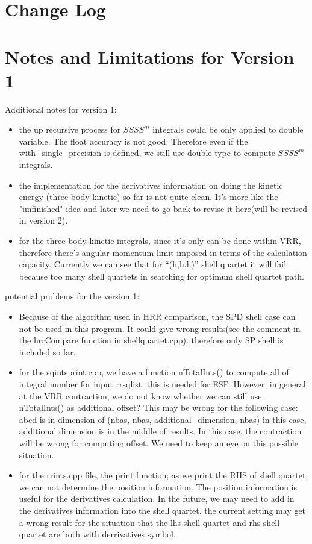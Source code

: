 \section{Change Log}

\section{Notes and Limitations for Version 1}
\label{v1_notes_limits}

Additional notes for version 1:
\begin{itemize}
 \item the up recursive process for $SSSS^{m}$ integrals could be
  only applied to double variable. The float accuracy
  is not good. Therefore even if the with\_single\_precision
  is defined, we still use double type to compute $SSSS^{m}$
  integrals.
 \item the implementation for the derivatives information on
  doing the kinetic energy (three body kinetic) so far
  is not quite clean. It's more like the "unfinished"
  idea and later we need to go back to revise it here(will be revised
  in version 2).
 \item for the three body kinetic integrals, since it's only
  can be done within VRR, therefore there's angular
  momentum limit imposed in terms of the calculation
  capacity. Currently we can see that for ``(h,h,h)''
  shell quartet it will fail because too many shell
  quartets in searching for optimum shell quartet path.
\end{itemize}

potential problems for the version 1:

\begin{itemize}
 \item Because of the algorithm used in HRR comparison,
  the SPD shell case can not be used in this program.
  It could give wrong results(see the comment in the
  hrrCompare function in shellquartet.cpp).
  therefore only SP shell is included so far.
 \item for the sqintsprint.cpp, we have a function nTotalInts()
  to compute all of integral number for input rrsqlist.
  this is needed for ESP. However, in general at the
  VRR contraction, we do not know whether we can still
  use nTotalInts() as additional offset? This may be
  wrong for the following case:
  abcd is in dimension of (nbas, nbas, additional\_dimension, nbas)
  in this case, additional dimension is in the middle
  of results. In this case, the contraction will be
  wrong for computing offset.
  We need to keep an eye on this possible situation.
 \item for the rrints.cpp file, the print function; as we
  print the RHS of shell quartet; we can not determine
  the position information. The position information
  is useful for the derivatives calculation. In the future,
  we may need to add in the derivatives information into
  the shell quartet.
  the current setting may get a wrong result for the
  situation that the lhs shell quartet and rhs shell
  quartet are both with derrivatives symbol.
\end{itemize}

